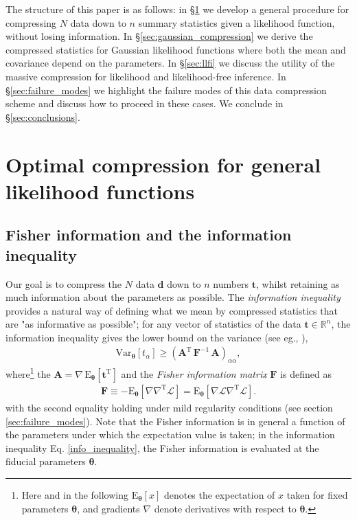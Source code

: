 \documentclass[fleqn,usenatbib]{mnras}
\def\btheta{\boldsymbol{\theta}}
\def\data{\mathbf{d}}
\def\bdtwidle{\mathbf{t}}
\def\fisher{\mathbf{F}}
\def\transpose{\mathrm{T}}
\def\L{\mathcal{L}}
\def\transpose{\mathrm{T}}
\begin{document}
The structure of this paper is as follows: in \S \ref{sec:score_compression} we develop a general procedure for compressing $N$ data down to $n$ summary statistics given a likelihood function, without losing information. In \S \ref{sec:gaussian_compression} we derive the compressed statistics for Gaussian likelihood functions where both the mean and covariance depend on the parameters. In \S \ref{sec:llfi} we discuss the utility of the massive compression for likelihood and likelihood-free inference. In \S \ref{sec:failure_modes} we highlight the failure modes of this data compression scheme and discuss how to proceed in these cases. We conclude in \S \ref{sec:conclusions}.
%
\section{Optimal compression for general likelihood functions}
\label{sec:score_compression}
%
\subsection{Fisher information and the information inequality}
%
Our goal is to compress the $N$ data $\data$ down to $n$ numbers $\bdtwidle$, whilst retaining as much information about the parameters as possible. The \emph{information inequality} provides a natural way of defining what we mean by compressed statistics that are "as informative as possible"; for any vector of statistics of the data $\mathbf{t}\in\mathbb{R}^n$, the information inequality gives the lower bound on the variance (see eg., \citealp{Lehmann2006}),
\begin{align}
\label{info_inequality}
\mathrm{Var}_{\boldsymbol\theta}\left[t_\alpha\right] \geq \left(\mathbf{A}^\transpose\,\fisher^{-1}\,\mathbf{A}\right)_{\alpha\alpha},
\end{align}
where\footnote{Here and in the following $\mathrm{E}_{\btheta}[x]$ denotes the expectation of $x$ taken for fixed parameters $\btheta$, and gradients $\nabla$ denote derivatives with respect to $\btheta$.} the $\mathbf{A} = \nabla\,\mathrm{E}_{\btheta}\left[\mathbf{t}^\transpose\right]$  and the \emph{Fisher information matrix} $\fisher$ is defined as 
\begin{align}
\fisher \equiv  - \mathrm{E}_{\boldsymbol\theta}\left[\nabla\nabla^\transpose\L\right] = \mathrm{E}_{\boldsymbol\theta}\left[\nabla\L\nabla^\transpose\L\right].
\end{align}
with the second equality holding under mild regularity conditions (see section \ref{sec:failure_modes}).
Note that the Fisher information is in general a function of the parameters under which the expectation value is taken; in the information inequality Eq. \eqref{info_inequality}, the Fisher information is evaluated at the fiducial parameters $\btheta$.
\end{document}
